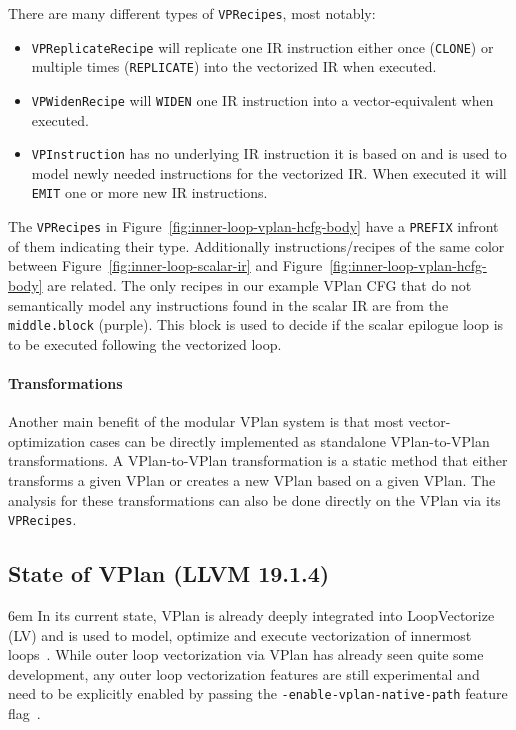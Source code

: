 \documentclass[sigplan,11pt,nonacm]{acmart}
\begin{document}
There are many different types of \texttt{VPRecipes}, most notably:
\begin{itemize}
  \item \texttt{VPReplicateRecipe} will replicate one IR instruction either once (\texttt{CLONE})
  or multiple times (\texttt{REPLICATE}) into the vectorized IR when executed.
  \item \texttt{VPWidenRecipe} will \texttt{WIDEN} one IR instruction into a
  vector-equivalent when executed.
  \item \texttt{VPInstruction} has no underlying IR instruction it is based on and is used 
  to model newly needed instructions for the vectorized IR. When executed it will 
  \texttt{EMIT} one or more new IR instructions.
\end{itemize}

The \texttt{VPRecipes} in Figure~\ref{fig:inner-loop-vplan-hcfg-body} have a \texttt{PREFIX}
infront of them indicating their type. Additionally instructions/recipes of the same color 
between Figure~\ref{fig:inner-loop-scalar-ir} and Figure~\ref{fig:inner-loop-vplan-hcfg-body}
are related. The only recipes in our example VPlan CFG that do not semantically model any 
instructions found in the scalar IR are from the \texttt{middle.block} (purple). This block 
is used to decide if the scalar epilogue loop is to be executed following the vectorized loop.

\paragraph{Transformations}
Another main benefit of the modular VPlan system is that most vector-optimization cases can 
be directly implemented as standalone VPlan-to-VPlan transformations. A VPlan-to-VPlan 
transformation is a static method that either transforms a given VPlan or creates a new 
VPlan based on a given VPlan. The analysis for these transformations can also be done 
directly on the VPlan via its \texttt{VPRecipes}.

\subsection{State of VPlan (LLVM 19.1.4)}
\emergencystretch 6em
In its current state, VPlan is already deeply integrated into LoopVectorize (LV) and is
used to model, optimize and execute vectorization of innermost loops~\cite{llvmvplan,llvmintrvplan,llvmvplanupdate}. 
While outer loop vectorization via VPlan has already seen quite some development, any 
outer loop vectorization features are still experimental and need to be explicitly enabled 
by passing the \texttt{-enable-\allowbreak vplan-\allowbreak native-\allowbreak path} 
feature flag~\cite{llvmouterloop,llvmouterloopstatus}.
\end{document}
